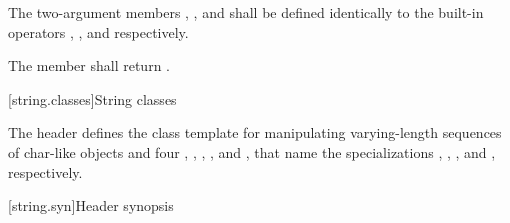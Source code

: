 \pnum
The two-argument members
,
,
and
shall be defined identically
to the built-in operators
\tcode{=},
\tcode{==},
and
\tcode{<}
respectively.

\pnum
The member
shall return
.

[string.classes]{String classes}

\pnum
The header  defines the
 class template for manipulating
varying-length sequences of char-like objects and four
, ,
,
,
and , that name
the specializations
,
,
,
and
, respectively.

[string.syn]{Header  synopsis}
%
%

